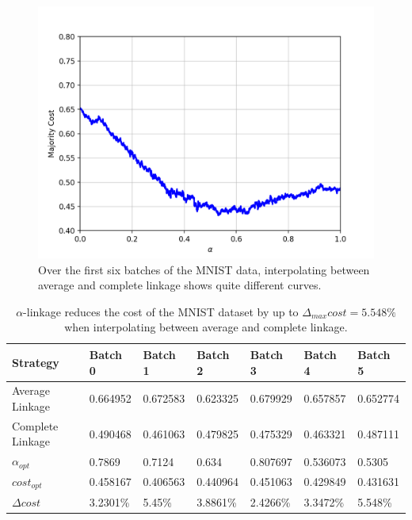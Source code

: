 \begin{figure}[H]
\begin{minipage}{.3\textwidth}
\end{minipage}
\begin{minipage}{.3\textwidth}
  \centering
  \includegraphics[width=\linewidth]{plots/mnist-ac-5}
\end{minipage}
\caption{Over the first six batches of the MNIST data, interpolating between average and complete linkage shows quite different curves.}
\label{fig:mnist1000acbatch}
\end{figure}

\begin{table}[h]
    \centering
    \begin{tabular}{|l | l l l l l l |}
    \hline
    Strategy & Batch 0 & Batch 1 & Batch 2 & Batch 3 & Batch 4 & Batch 5\\ \hline
    Average Linkage & 0.664952 & 0.672583 & 0.623325 & 0.679929 & 0.657857 & 0.652774\\
    Complete Linkage & 0.490468 & 0.461063 & 0.479825 & 0.475329 & 0.463321 & 0.487111\\
    $\alpha_{opt}$ & 0.7869 & 0.7124 & 0.634 & 0.807697 & 0.536073 & 0.5305\\
    $cost_{opt}$ & 0.458167 & 0.406563 & 0.440964 & 0.451063 & 0.429849 & 0.431631\\
    $\Delta cost$ & 3.2301\% & 5.45\% & 3.8861\% & 2.4266\% & 3.3472\% & 5.548\%\\\hline
    \end{tabular}
    \caption{$\alpha$-linkage reduces the cost of the MNIST dataset by up to $\Delta_{max} cost = 5.548\%$ when interpolating between average and complete linkage.}
    \label{table:mnist1000acbatch}
\end{table}

